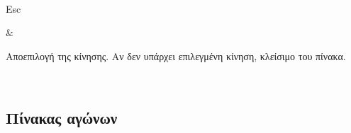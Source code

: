 \documentclass[letterpaper,10pt,greek]{sphinxmanual}
\begin{document}
\begin{savenotes}
\begin{tabular}[t]{}
\\
\sphinxhline\begin{varwidth}[t]{}
\sphinxAtStartPar
Esc
\sphinxbeforeendvarwidth
\end{varwidth}%
&\begin{varwidth}[t]{}
\sphinxAtStartPar
Αποεπιλογή της κίνησης. Αν δεν υπάρχει επιλεγμένη κίνηση, κλείσιμο του πίνακα.
\sphinxbeforeendvarwidth
\end{varwidth}%
\\
\sphinxbottomrule
\end{tabular}
\sphinxtableafterendhook\par
\sphinxattableend\end{savenotes}


\subsection{Πίνακας αγώνων}
\label{\detokenize{raccourcis:panneau-des-matchs}}\label{\detokenize{raccourcis:raccourcis-match-panel}}
\end{document}
